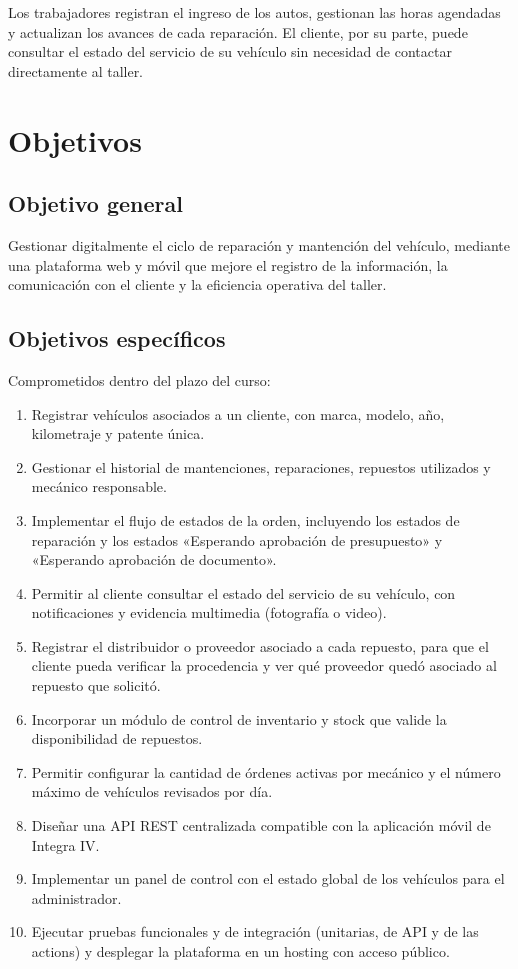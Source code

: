 \documentclass[11pt]{article}
\begin{document}
Los trabajadores registran el ingreso de los autos, gestionan las horas agendadas y actualizan los avances de cada reparación. El cliente, por su parte, puede consultar el estado del servicio de su vehículo sin necesidad de contactar directamente al taller.

\section{Objetivos}

\subsection{Objetivo general}

Gestionar digitalmente el ciclo de reparación y mantención del vehículo, mediante una plataforma web y móvil que mejore el registro de la información, la comunicación con el cliente y la eficiencia operativa del taller.

\subsection{Objetivos específicos}

Comprometidos dentro del plazo del curso:

\begin{enumerate}
  \item Registrar vehículos asociados a un cliente, con marca, modelo, año, kilometraje y patente única.
  \item Gestionar el historial de mantenciones, reparaciones, repuestos utilizados y mecánico responsable.
  \item Implementar el flujo de estados de la orden, incluyendo los estados de reparación y los estados «Esperando aprobación de presupuesto» y «Esperando aprobación de documento».
  \item Permitir al cliente consultar el estado del servicio de su vehículo, con notificaciones y evidencia multimedia (fotografía o video).
  \item Registrar el distribuidor o proveedor asociado a cada repuesto, para que el cliente pueda verificar la procedencia y ver qué proveedor quedó asociado al repuesto que solicitó.
  \item Incorporar un módulo de control de inventario y stock que valide la disponibilidad de repuestos.
  \item Permitir configurar la cantidad de órdenes activas por mecánico y el número máximo de vehículos revisados por día.
  \item Diseñar una API REST centralizada compatible con la aplicación móvil de Integra IV.
  \item Implementar un panel de control con el estado global de los vehículos para el administrador.
  \item Ejecutar pruebas funcionales y de integración (unitarias, de API y de las actions) y desplegar la plataforma en un hosting con acceso público.
\end{enumerate}
\end{document}
